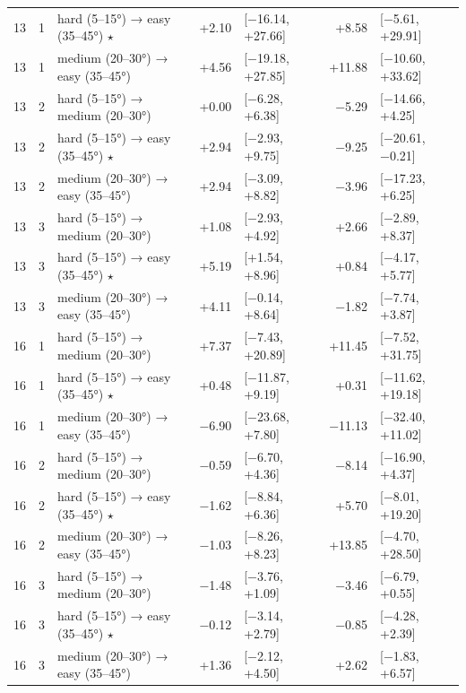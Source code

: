 \begin{table}[htbp]
\begin{tabular}{rllrlrl}
    13 & 1 & hard (5–15°) → easy (35–45°) $\star$ & +2.10 & [−16.14, +27.66] & +8.58 & [−5.61, +29.91] \\
    13 & 1 & medium (20–30°) → easy (35–45°) & +4.56 & [−19.18, +27.85] & +11.88 & [−10.60, +33.62] \\
    13 & 2 & hard (5–15°) → medium (20–30°) & +0.00 & [−6.28, +6.38] & −5.29 & [−14.66, +4.25] \\
    13 & 2 & hard (5–15°) → easy (35–45°) $\star$ & +2.94 & [−2.93, +9.75] & −9.25 & [−20.61, −0.21] \\
    13 & 2 & medium (20–30°) → easy (35–45°) & +2.94 & [−3.09, +8.82] & −3.96 & [−17.23, +6.25] \\
    13 & 3 & hard (5–15°) → medium (20–30°) & +1.08 & [−2.93, +4.92] & +2.66 & [−2.89, +8.37] \\
    13 & 3 & hard (5–15°) → easy (35–45°) $\star$ & +5.19 & [+1.54, +8.96] & +0.84 & [−4.17, +5.77] \\
    13 & 3 & medium (20–30°) → easy (35–45°) & +4.11 & [−0.14, +8.64] & −1.82 & [−7.74, +3.87] \\
    16 & 1 & hard (5–15°) → medium (20–30°) & +7.37 & [−7.43, +20.89] & +11.45 & [−7.52, +31.75] \\
    16 & 1 & hard (5–15°) → easy (35–45°) $\star$ & +0.48 & [−11.87, +9.19] & +0.31 & [−11.62, +19.18] \\
    16 & 1 & medium (20–30°) → easy (35–45°) & −6.90 & [−23.68, +7.80] & −11.13 & [−32.40, +11.02] \\
    16 & 2 & hard (5–15°) → medium (20–30°) & −0.59 & [−6.70, +4.36] & −8.14 & [−16.90, +4.37] \\
    16 & 2 & hard (5–15°) → easy (35–45°) $\star$ & −1.62 & [−8.84, +6.36] & +5.70 & [−8.01, +19.20] \\
    16 & 2 & medium (20–30°) → easy (35–45°) & −1.03 & [−8.26, +8.23] & +13.85 & [−4.70, +28.50] \\
    16 & 3 & hard (5–15°) → medium (20–30°) & −1.48 & [−3.76, +1.09] & −3.46 & [−6.79, +0.55] \\
    16 & 3 & hard (5–15°) → easy (35–45°) $\star$ & −0.12 & [−3.14, +2.79] & −0.85 & [−4.28, +2.39] \\
    16 & 3 & medium (20–30°) → easy (35–45°) & +1.36 & [−2.12, +4.50] & +2.62 & [−1.83, +6.57] \\
    \bottomrule
  \end{tabular}
\end{table}
